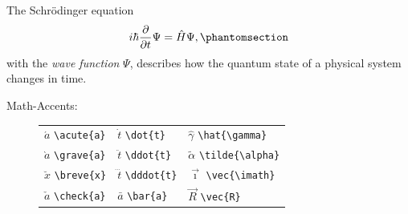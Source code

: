 \documentclass[a4paper]{article}
\newlength{\DUtablewidth} %
\begin{document}
The Schrödinger equation
%
\begin{equation*}
i\hbar \frac{\partial }{\partial t}\Psi  = \hat{H}\Psi ,
\phantomsection
\label{eq-schrodinger}
\end{equation*}
with the \emph{wave function} $\Psi $, describes how the quantum state of a
physical system changes in time.
%
\begin{description}
\item[{Math-Accents:}] \leavevmode 
\setlength{\DUtablewidth}{\linewidth}
\begin{longtable*}[c]{p{0.315\DUtablewidth}p{0.315\DUtablewidth}p{0.315\DUtablewidth}}

$\acute{a}$      \texttt{\textbackslash{}acute\{a\}}
 & 
$\dot{t}$        \texttt{\textbackslash{}dot\{t\}}
 & 
$\hat{\gamma}$   \texttt{\textbackslash{}hat\{\textbackslash{}gamma\}}
 \\

$\grave{a}$      \texttt{\textbackslash{}grave\{a\}}
 & 
$\ddot{t}$       \texttt{\textbackslash{}ddot\{t\}}
 & 
$\tilde{\alpha}$ \texttt{\textbackslash{}tilde\{\textbackslash{}alpha\}}
 \\

$\breve{x}$      \texttt{\textbackslash{}breve\{x\}}
 & 
$\dddot{t}$      \texttt{\textbackslash{}dddot\{t\}}
 & 
$\vec{\imath}$   \texttt{\textbackslash{}vec\{\textbackslash{}imath\}}
 \\

$\check{a}$      \texttt{\textbackslash{}check\{a\}}
 & 
$\bar{a}$        \texttt{\textbackslash{}bar\{a\}}
 & 
$\vec{R}$        \texttt{\textbackslash{}vec\{R\}}
 \\
\end{longtable*}

\end{description}

\end{document}
